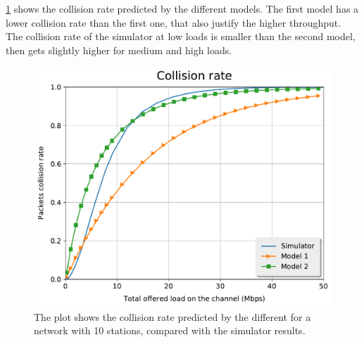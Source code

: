 \cref{fig:cr_10} shows the collision rate predicted by the different models.
The first model has a lower collision rate than the first one, that also justify the higher throughput.
The collision rate of the simulator at low loads is smaller than the second model, then gets slightly higher for medium and high loads.

\begin{figure}[t]
	\centering
	\includegraphics[width=.99\columnwidth]{figures/cr_10}
	\caption{The plot shows the collision rate predicted by the different for a network with 10 stations, compared with the simulator results.}
	\label{fig:cr_10}
\end{figure}

